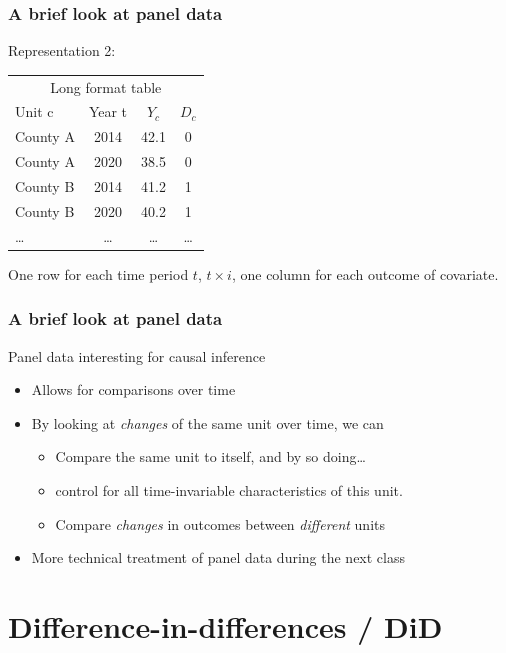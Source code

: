 \documentclass[12pt,english,dvipsnames,aspectratio=169,handout]{beamer}\usepackage[]{graphicx}\usepackage[]{xcolor}
\begin{document}
\begin{frame}
  \frametitle{A brief look at panel data}
\footnotesize

Representation 2: 

\scriptsize
\begin{table}\centering
\begin{tabular}{lccc}
\toprule
\multicolumn{4}{c}{Long format table} \\
Unit c   & Year t  & $Y_c$  & $D_c$  \\
\midrule
County A & 2014  & 42.1 & 0   \\
County A & 2020  & 38.5 & 0   \\
County B & 2014  & 41.2 & 1   \\
County B & 2020  & 40.2 & 1   \\
\ldots  &\ldots &\ldots &\ldots  \\
\bottomrule
\end{tabular}
\end{table}

One row for each time period $t$, $t\times i$, one column for each outcome of covariate.

\end{frame}




\begin{frame}
  \frametitle{A brief look at panel data}
\footnotesize

Panel data interesting for causal inference
\begin{itemize}
  \item Allows for comparisons over time
  \item By looking at \emph{changes} of the same unit over time, we can
    \begin{itemize}\footnotesize
      \item Compare the same unit to itself, and by so doing\ldots
      \item control for all time-invariable characteristics of this unit.
      \item Compare \emph{changes} in outcomes between \emph{different} units 
    \end{itemize}
  \item More technical treatment of panel data during the next class
\end{itemize}

\end{frame}



\section{Difference-in-differences / DiD}
\end{document}
